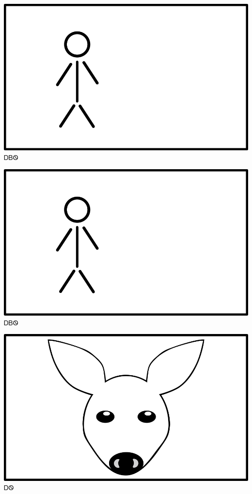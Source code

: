 \documentclass[avery5371]{flashcards}%
\begin{document}
    \begin{flashcard}{
        \includegraphics[width=0.95\columnwidth,height=.51\columnwidth,keepaspectratio]{../artwork/flags/ayvwi-no-flag}
    }
        \Huge ᎠᏴᏫ
    \end{flashcard}

    \begin{flashcard}{
        \includegraphics[width=0.95\columnwidth,height=.51\columnwidth,keepaspectratio]{../artwork/flags/ayvwi-no-flag}
    }
        \Huge ᎠᏴᏫ
    \end{flashcard}


    \begin{flashcard}{
        \includegraphics[width=0.95\columnwidth,height=.51\columnwidth,keepaspectratio]{../artwork/objects-animate/ahwi}
    }
        \Huge ᎠᏫ
    \end{flashcard}
\end{document}
